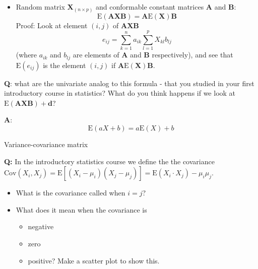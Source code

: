 \documentclass[ignorenonframetext,]{beamer}
\providecommand{\tightlist}{%
  \setlength{\itemsep}{0pt}\setlength{\parskip}{0pt}}
\begin{document}
\begin{frame}

\begin{itemize}
\tightlist
\item
  Random matrix \(\mathbf{X}_{(n\times p)}\) and conformable constant
  matrices \(\mathbf{A}\) and \(\mathbf{B}\):
  \[\text{E}(\mathbf{A}\mathbf{X}\mathbf{B})=\mathbf{A}\text{E}(\mathbf{X})\mathbf{B}\]
  Proof: Look at element \((i,j)\) of \(\mathbf{A}\mathbf{X}\mathbf{B}\)
  \[e_{ij}=\sum_{k=1}^n a_{ik} \sum_{l=1}^p X_{kl}b_{lj}\] (where
  \(a_{ik}\) and \(b_{lj}\) are elements of \(\mathbf{A}\) and
  \(\mathbf{B}\) respectively), and see that \(\text{E}(e_{ij})\) is the
  element \((i,j)\) if \(\mathbf{A}\text{E}(\mathbf{X})\mathbf{B}\).
\end{itemize}

\textbf{Q}: what are the univariate analog to this formula - that you
studied in your first introductory course in statistics? What do you
think happens if we look at
\(\text{E}(\mathbf{A}\mathbf{X}\mathbf{B})+\mathbf{d}\)?

\textbf{A}: \[\text{E}(aX+b)=a \text{E}(X)+b\]

\end{frame}

\begin{frame}

\begin{block}{Variance-covariance matrix}

\textbf{Q:} In the introductory statistics course we define the the
covariance
\(\text{Cov}(X_i,X_j)=\text{E}[(X_i-\mu_i)(X_j-\mu_j)]=\text{E}(X_i \cdot X_j)-\mu_i\mu_j\).

\begin{itemize}
\tightlist
\item
  What is the covariance called when \(i=j\)?
\item
  What does it mean when the covariance is

  \begin{itemize}
  \tightlist
  \item
    negative
  \item
    zero
  \item
    positive? Make a scatter plot to show this.
  \end{itemize}
\end{itemize}

\end{block}

\end{frame}
\end{document}
